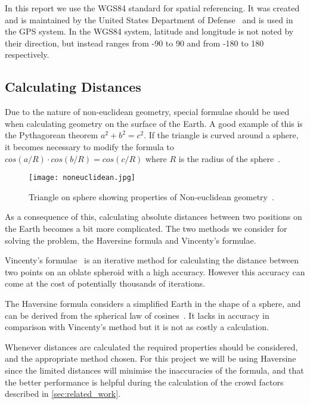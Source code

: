 In this report we use the WGS84 standard for spatial referencing. It was created and is maintained by the United States Department of Defense~\cite{WGS84} and is used in the GPS system. In the WGS84 system, latitude and longitude is not noted by their direction, but instead ranges from -90 to 90 and from -180 to 180 respectively.

\subsection{Calculating Distances}

Due to the nature of non-euclidean geometry, special formulae should be used when calculating geometry on the surface of the Earth. A good example of this is the Pythagorean theorem $a^2 + b^2 = c^2$. If the triangle is curved around a sphere, it becomes necessary to modify the formula to $cos(a/R) \cdot cos(b/R) = cos(c/R)$ where $R$ is the radius of the sphere~\cite{website:lawofcosines}.

\begin{figure}[htbp]
    \centering
\texttt{[image: noneuclidean.jpg]}
\caption[Triangle on sphere]{Triangle on sphere showing properties of Non-euclidean geometry~\cite{earthtriangle}.}
\label{noneuclidean}
\end{figure}

As a consequence of this, calculating absolute distances between two positions on the Earth becomes a bit more complicated. The two methods we consider for solving the problem, the Haversine formula and Vincenty's formulae.

Vincenty's formulae~\cite{vincenty} is an iterative method for calculating the distance between two points on an oblate spheroid with a high accuracy. However this accuracy can come at the cost of potentially thousands of iterations.

The Haversine formula considers a simplified Earth in the shape of a sphere, and can be derived from the spherical law of cosines~\cite{website:lawofcosines}. It lacks in accuracy in comparison with Vincenty's method but it is not as costly a calculation.

Whenever distances are calculated the required properties should be considered, and the appropriate method chosen. For this project we will be using Haversine since the limited distances will minimise the inaccuracies of the formula, and that the better performance is helpful during the calculation of the crowd factors described in \cref{sec:related_work}.

